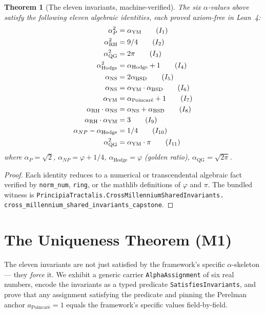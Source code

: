 \documentclass[11pt,a4paper]{article}
\theoremstyle{plain}
\newtheorem{theorem}{Theorem}[section]
\theoremstyle{definition}
\begin{document}
\begin{theorem}[The eleven invariants, machine-verified]
\label{thm:invariants}
The six $\alpha$-values above satisfy the following eleven algebraic
identities, each proved axiom-free in Lean~4:
\begin{align}
\alpha_{P}^{2} &= \alpha_{\mathrm{YM}} \tag{$I_{1}$}\\
\alpha_{\mathrm{RH}}^{2} &= 9/4 \tag{$I_{2}$}\\
\alpha_{\mathrm{QG}}^{2} &= 2\pi \tag{$I_{3}$}\\
\alpha_{\mathrm{Hodge}}^{2} &= \alpha_{\mathrm{Hodge}} + 1 \tag{$I_{4}$}\\
\alpha_{\mathrm{NS}} &= 2 \alpha_{\mathrm{BSD}} \tag{$I_{5}$}\\
\alpha_{\mathrm{NS}} &= \alpha_{\mathrm{YM}} \cdot \alpha_{\mathrm{BSD}} \tag{$I_{6}$}\\
\alpha_{\mathrm{YM}} &= \alpha_{\mathrm{Poincar\acute e}} + 1 \tag{$I_{7}$}\\
\alpha_{\mathrm{RH}} \cdot \alpha_{\mathrm{NS}} &=
  \alpha_{\mathrm{NS}} + \alpha_{\mathrm{BSD}} \tag{$I_{8}$}\\
\alpha_{\mathrm{RH}} \cdot \alpha_{\mathrm{YM}} &= 3 \tag{$I_{9}$}\\
\alpha_{NP} - \alpha_{\mathrm{Hodge}} &= 1/4 \tag{$I_{10}$}\\
\alpha_{\mathrm{QG}}^{2} &= \alpha_{\mathrm{YM}} \cdot \pi \tag{$I_{11}$}
\end{align}
where $\alpha_{P} = \sqrt{2}$, $\alpha_{NP} = \varphi + 1/4$,
$\alpha_{\mathrm{Hodge}} = \varphi$ (golden ratio),
$\alpha_{\mathrm{QG}} = \sqrt{2\pi}$.
\end{theorem}

\begin{proof}
Each identity reduces to a numerical or transcendental algebraic
fact verified by \texttt{norm\_num}, \texttt{ring}, or the
mathlib definitions of $\varphi$ and $\pi$. The bundled witness is
\texttt{PrincipiaTractalis.CrossMillenniumSharedInvariants.\\
cross\_millennium\_shared\_invariants\_capstone}.
\end{proof}

\section{The Uniqueness Theorem (M1)}
\label{sec:uniqueness}

The eleven invariants are not just satisfied by the framework's
specific $\alpha$-skeleton --- they \emph{force} it. We exhibit a
generic carrier \texttt{AlphaAssignment} of six real numbers, encode
the invariants as a typed predicate \texttt{SatisfiesInvariants},
and prove that any assignment satisfying the predicate and pinning
the Perelman anchor $a_{\mathrm{Poincar\acute e}} = 1$ equals the
framework's specific values field-by-field.
\end{document}
